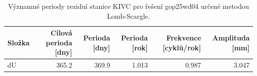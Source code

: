 \begin{table}[H]
\centering
\caption{Významné periody reziduí stanice KIVC pro řešení gop25wd04 určené metodou Lomb-Scargle.}
\label{tab:gop25wd04_stcd_kivc_detr_weighted_1seg_spectral_lomb_scargle_significant_periods}
\begin{tabular}{lrrrrr}
\toprule
Složka & Cílová perioda [dny] & Perioda [dny] & Perioda [rok] & Frekvence [cyklů/rok] & Amplituda [mm] \\
\midrule
dU & 365.2 & 369.9 & 1.013 & 0.987 & 3.047 \\
\bottomrule
\end{tabular}
\end{table}
